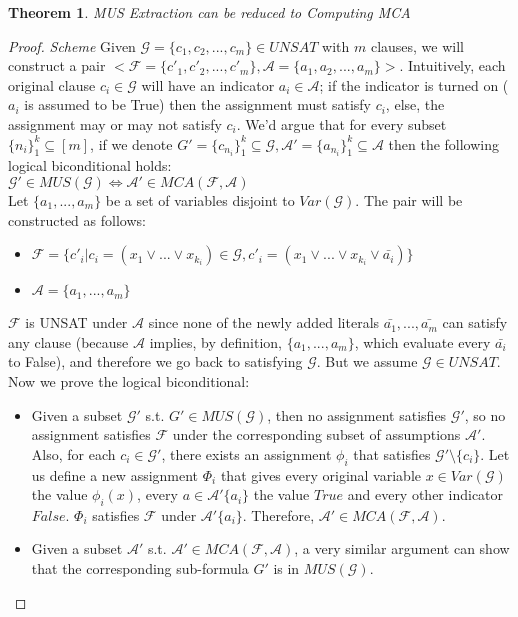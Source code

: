 \documentclass[]{article}
\newtheorem{theorem}{Theorem}
\begin{document}
	\begin{theorem}
		MUS Extraction can be reduced to Computing MCA
	\end{theorem}
	\begin{proof} \textit{Scheme}
		Given $ \mathcal{G}=\{c_1,c_2,...,c_m\} \in UNSAT$ with $ m $ clauses, we will construct a pair  $ <\mathcal{F}=\{c'_1,c'_2,...,c'_m\},\mathcal{A}=\{a_1,a_2,...,a_m\}> $. Intuitively, each original clause $ c_i \in \mathcal{G} $ will have an indicator $ a_i \in \mathcal{A} $; if the indicator is turned on ($ a_i$ is assumed to be True) then the assignment must satisfy $ c_i $, else, the assignment may or may not satisfy $ c_i $. We'd argue that for every subset $\{n_i\}_1^k \subseteq [m] $, if we denote  ${G}'=\{c_{n_i}\}_1^k \subseteq \mathcal{G}, \mathcal{A}'=\{a_{n_i}\}_1^k \subseteq \mathcal{A}$ then the following logical biconditional holds: \\ 
		$ \mathcal{G}'\in MUS(\mathcal{G}) \iff  \mathcal{A}'\in MCA(\mathcal{F}, \mathcal{A}) $ \\
		Let $ \{a_1,...,a_m\} $ be a set of variables disjoint to $ Var(\mathcal{G}) $. The pair will be constructed as follows:
		\begin{itemize}
			\item $ \mathcal{F}=\{c'_i | c_i = (x_1 \lor ... \lor x_{k_i})\in\mathcal{G}, c'_i= (x_1 \lor ... \lor x_{k_i} \lor \bar{a_i}) \} $
			\item $ \mathcal{A}=\{a_1,...,a_m\} $
		\end{itemize}
	$ \mathcal{F} $ is UNSAT under $ \mathcal{A} $ since none of the newly added literals $ \bar{a_1},...,\bar{a_m} $ can satisfy any clause (because $ \mathcal{A} $ implies, by definition, $ \{a_1,...,a_m\} $, which evaluate every $ \bar{a_i} $ to False), and therefore we go back to satisfying $ \mathcal{G}$. But we assume $ \mathcal{G} \in UNSAT $. \\
	Now we prove the logical biconditional:
	\begin{itemize}
		\item Given a subset $ \mathcal{G}'$ s.t. $ {G}' \in MUS(\mathcal{G}) $, then no assignment satisfies $ \mathcal{G}' $, so no assignment satisfies $ \mathcal{F} $ under the corresponding subset of assumptions $ \mathcal{A}'$. Also, for each $ c_i \in \mathcal{G}'$, there exists an assignment $ \phi_i $ that satisfies $ \mathcal{G}' \setminus \{c_i\}$. Let us define a new assignment $ \Phi_i $ that gives every original variable $ x \in Var(\mathcal{G}) $ the value $ \phi_i(x) $, every $ a \in \mathcal{A}'\{a_i\}$ the value $ True $ and every other indicator $ False $. $ \Phi_i $ satisfies $ \mathcal{F} $ under $\mathcal{A}'\{a_i\}$. Therefore, $ \mathcal{A}' \in MCA(\mathcal{F,A}) $.
		\item Given a subset $ \mathcal{A}'$ s.t. $ \mathcal{A}' \in MCA(\mathcal{F,A}) $, a very similar argument can show that the corresponding sub-formula $ {G}' $ is in $ MUS(\mathcal{G})$.
	\end{itemize}
	\end{proof}
\end{document}
